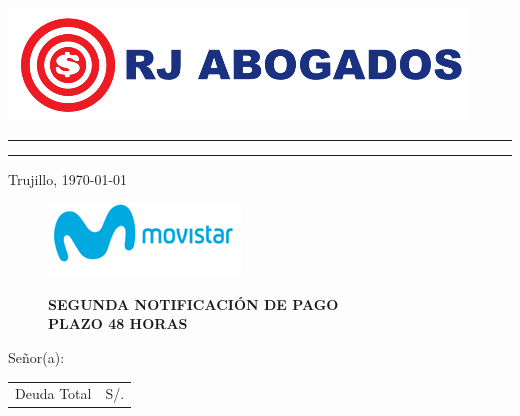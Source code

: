 %
%

\begin{flushleft}
\includegraphics[natwidth=12.170833333cm, natheight=2.989791667cm]{resources/logo.png}
\end{flushleft}
\vspace{-0.8cm}
\textcolor[rgb]{1.00,0.00,0.00}{
\hrule
\hrule
}

\begin{flushright}
    Trujillo, \today
\end{flushright}
\vspace{-0.5cm}

\begin{figure}[h]
\begin{minipage}[b]{5.106458333cm}
\includegraphics[natwidth=5.106458333cm, natheight=1.931458333cm]{resources/business_logo.png}
\end{minipage}
\begin{minipage}[b][1.9314cm][t]{11cm}
\hfill
\begin{flushright}
{\LARGE \bf SEGUNDA NOTIFICACIÓN DE PAGO\\PLAZO 48 HORAS}
\end{flushright}
\end{minipage}
\end{figure}

\noindent
Señor(a):\\

\begin{flushright}
\bf \large
\begin{tabular}{|p{3.2cm} p{3.2cm}|}
\hline
Deuda Total & S/. %
\hline
\end{tabular}
\end{flushright}

